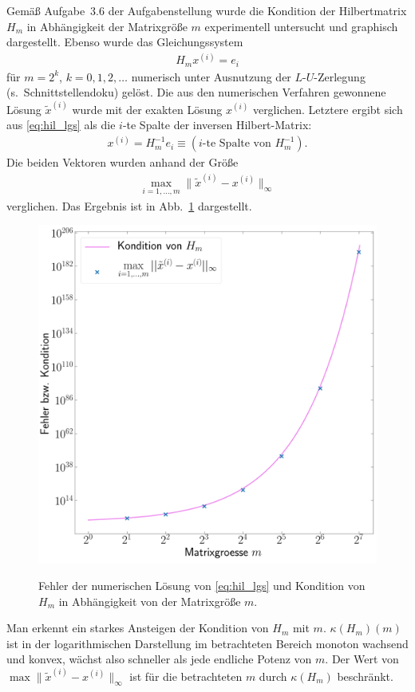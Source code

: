 \documentclass[smallheadings]{scrartcl}
\numberwithin{equation}{section}
\begin{document}
Gemäß Aufgabe~3.6 der Aufgabenstellung wurde die Kondition der Hilbertmatrix $H_m$ in Abhängigkeit der Matrixgröße $m$ experimentell untersucht und graphisch dargestellt. Ebenso wurde das Gleichungssystem 
\begin{align}
H_mx^{(i)}=e_i
\label{eq:hil_lgs}
\end{align}
für $m=2^k$, $k=0,1,2,\dots$ numerisch unter Ausnutzung der $L$-$U$-Zerlegung (s.~Schnittstellendoku) gelöst. Die aus den numerischen Verfahren gewonnene Lösung $\tilde{x}^{(i)}$ wurde mit der exakten Lösung $x^{(i)}$ verglichen. Letztere ergibt sich aus \eqref{eq:hil_lgs} als die $i$-te Spalte der inversen Hilbert-Matrix:
\begin{align}
x^{(i)}=H_m^{-1}e_i\equiv(\text{$i$-te Spalte von }H_m^{-1}).
\end{align}
Die beiden Vektoren wurden anhand der Größe
\begin{align*}
\max\limits_{i=1,\dots,m}\|\tilde{x}^{(i)}-x^{(i)}\|_\infty
\end{align*}
verglichen. Das Ergebnis ist in Abb.~\ref{fig:hil_kond_fehl}
dargestellt.

\begin{figure}[H]
\centering
\includegraphics[width=.8\textwidth]{Bericht/Bilder/hil_kond_fehl}
\label{fig:hil_kond_fehl}
\caption{Fehler der numerischen Lösung von \eqref{eq:hil_lgs} und Kondition von $H_m$ in Abhängigkeit von der Matrixgröße $m$.}
\end{figure}

Man erkennt ein starkes Ansteigen der Kondition von $H_m$ mit $m$. $\kappa(H_m)(m)$ ist in der logarithmischen Darstellung im betrachteten Bereich monoton wachsend und konvex, wächst also schneller als jede endliche Potenz von $m$. Der Wert von $\max\|\tilde{x}^{(i)}-x^{(i)}\|_\infty$ ist für die betrachteten $m$ durch $\kappa(H_m)$ beschränkt.
\end{document}
